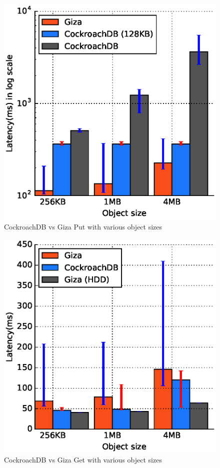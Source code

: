 
\begin{figure}[t]
      \includegraphics[width=\linewidth]{plots/giza_cock_put}
      \caption{CockroachDB vs Giza Put with various object sizes}
      \label{fig:eval_cock_put}
\end{figure}


\begin{figure}[t]
      \includegraphics[width=\linewidth]{plots/giza_cock_get}
      \caption{CockroachDB vs Giza Get with various object sizes}
      \label{fig:eval_cock_get}
\end{figure}
